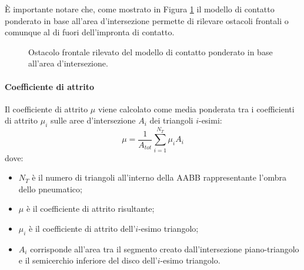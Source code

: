È importante notare che, come mostrato in Figura \ref{intersezione} il modello di contatto ponderato in base all'area d'intersezione permette di rilevare ostacoli frontali o comunque al di fuori dell'impronta di contatto.
\begin{figure}
	\centering
		\caption{Ostacolo frontale rilevato del modello di contatto ponderato in base all'area d'intersezione.}
	\label{intersezione}
\end{figure}
%
\paragraph{Coefficiente di attrito}
Il coefficiente di attrito $\mu$ viene calcolato come media ponderata tra i coefficienti di attrito $\mu_i$ sulle aree d'intersezione $A_i$ dei triangoli $i$-esimi:
%
\begin{equation}
\mu = \frac{1}{A_{tot}}\sum_{i=1}^{N_T}\mu_iA_i
\end{equation}
%
dove:
\begin{itemize}
	\item $N_T$ è il numero di triangoli all'interno della \ac{AABB} rappresentante l'ombra dello pneumatico;
	\item $\mu$ è il coefficiente di attrito risultante;
	\item $\mu_i$ è il coefficiente di attrito dell'$i$-esimo triangolo;
	\item $A_i$ corrisponde all'area tra il segmento creato dall'intersezione piano-triangolo e il semicerchio inferiore del disco dell'$i$-esimo triangolo.
\end{itemize}
%
